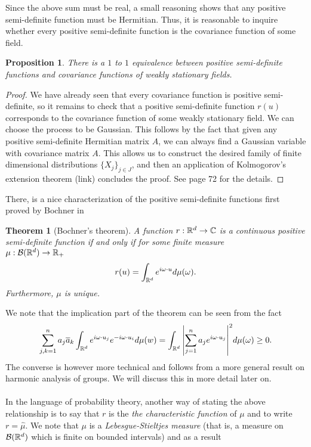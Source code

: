 \documentclass[12pt]{article}
\newtheorem{theorem}{Theorem}
\newtheorem{proposition}{Proposition}
\begin{document}
Since the above sum must be real, a small reasoning  shows that any positive semi-definite function must be Hermitian. Thus, it is reasonable to inquire whether every positive semi-definite function is the covariance function of some field.
\begin{proposition}
	There is a $1$ to  $1$ equivalence between positive semi-definite functions and  covariance functions of weakly stationary fields.
\end{proposition}
\begin{proof}
	We have already seen that every covariance function is positive semi-definite, so it remains to check that a positive semi-definite function $r(u)$ corresponds to the  covariance function of some weakly stationary field. We can choose the process to be Gaussian. This follows by the fact that given any positive semi-definite Hermitian matrix $A$,  we can always find a Gaussian variable with covariance matrix $A$. This allows us to construct the desired family of finite dimensional distributions $\{X_j\}_{j \in  J}$, and then an application of Kolmogorov's extension theorem (link) concludes the proof. See \cite{lindgren2012stationary} page 72 for the details.
\end{proof}
There, is a nice characterization of the positive semi-definite functions first proved by Bochner in \cite{bochner1933monotone}
\begin{theorem}[Bochner's theorem]\label{Bochner's theorem}
	A function $r:{\mathbb R}^d\to \mathbb{C}$ is a continuous positive semi-definite function if and only if for some finite measure\\ $\mu:\mathcal{B}({\mathbb R}^d)\to {\mathbb R}_+$
	\begin{equation*}
		r(u)=\int_{{\mathbb R}^d} e^{i\omega\cdot u}d\mu (\omega).
	\end{equation*}
	Furthermore, $\mu $ is unique.
\end{theorem}
We note that the implication part of the theorem can be seen from the fact
\begin{equation*}
	\sum_{j,k=1}^{n} a_j \overline{a}_k\int_{{\mathbb R}^d} e^{i\omega\cdot u_j}e^{-i\omega\cdot u_i} d\mu(w)=\int_{{\mathbb R}^d}\abs{\sum_{j=1}^{n} a_j e^{i\omega\cdot u_j}}^2d\mu(\omega)\geq 0.
\end{equation*}
The converse is however more technical and follows from a more general result on harmonic analysis of groups. We will discuss this in more detail later on.\\
\\
In the language of probability theory, another way of stating the above relationship is to say that $r$ is the  \emph{the characteristic function} of $\mu $ and to write $r=\hat{\mu}$. We note that $\mu $ is a \emph{Lebesgue-Stieltjes measure} (that is, a measure on $\mathcal{B}({\mathbb R}^d)$ which is finite on bounded intervals) and as a result
\end{document}
